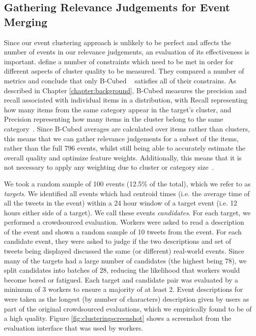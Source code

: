 \subsection{Gathering Relevance Judgements for Event Merging}
\label{sec:clustering}
\label{collection:sec:eval}
Since our event clustering approach is unlikely to be perfect and affects the number of events in our relevance judgements, an evaluation of its effectiveness is important.
\cite{Amigo:2009:CEC:1555682.1555686} define a number of constraints which need to be met in order for different aspects of cluster quality to be measured.
They compared a number of metrics and conclude that only B-Cubed ~\citep{Bagga:1998:ECC:980845.980859} satisfies all of their constrains.
As described in Chapter \ref{chapter:background}, B-Cubed measures the precision and recall associated with individual items in a distribution, with Recall representing how many items from the same category appear in the target's cluster, and Precision representing how many items in the cluster belong to the same category~\citep{Amigo:2009:CEC:1555682.1555686}.
Since B-Cubed averages are calculated over items rather than clusters, this means that we can gather relevance judgements for a subset of the items, rather than the full 796 events, whilst still being able to accurately estimate the overall quality and optimize feature weights.
Additionally, this means that it is not necessary to apply any weighting due to cluster or category size~\citep{Amigo:2009:CEC:1555682.1555686}.

We took a random sample of 100 events (12.5\% of the total), which we refer to as \emph{targets}.
We identified all events which had centroid times (i.e. the average time of all the tweets in the event) within a 24 hour window of a target event (i.e. 12 hours either side of a target).
We call these events \emph{candidates}.
For each target, we performed a crowdsourced evaluation.
Workers were asked to read a description of the event and shown a random sample of 10 tweets from the event.
For each candidate event, they were asked to judge if the two descriptions and set of tweets being displayed discussed the same (or different) real-world events.
Since many of the targets had a large number of candidates (the highest being 78), we split candidates into batches of 28, reducing the likelihood that workers would become bored or fatigued.
Each target and candidate pair was evaluated by a minimum of 3 workers to ensure a majority of at least 2.
Event descriptions for were taken as the longest (by number of characters) description given by users as part of the original crowdsourced evaluations, which we empirically found to be of a high quality.
Figure \ref{fig:clusteringscreenshot} shows a screenshot from the evaluation interface that was used by workers.

